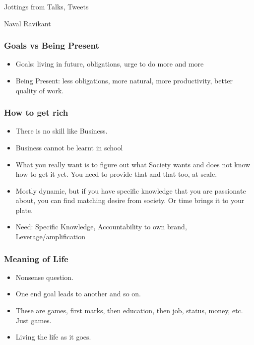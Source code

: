 \begin{frame}[fragile]\frametitle{}
\begin{center}
{\Large Jottings from Talks, Tweets}

{\small Naval Ravikant}


\end{center}
\end{frame}


\begin{frame}[fragile]\frametitle{Goals vs Being Present}

\begin{itemize}
\item Goals: living in future, obligations, urge to do more and more
\item Being Present: less obligations, more natural, more productivity, better quality of work.
\end{itemize}

\end{frame}


\begin{frame}[fragile]\frametitle{How to get rich}

\begin{itemize}
\item There is no skill like Business.
\item Business cannot be learnt in school
\item What you really want is to figure out what Society wants and does not know how to get it yet. You need to provide that and that too, at scale.
\item Mostly dynamic, but if you have specific knowledge that you are passionate about, you can find matching desire from society. Or time brings it to your plate.
\item Need: Specific Knowledge, Accountability to own brand, Leverage/amplification
\end{itemize}

\end{frame}

\begin{frame}[fragile]\frametitle{Meaning of Life}

\begin{itemize}
\item Nonsense question.
\item One end goal leads to another and so on.
\item These are games, first marks, then education, then job, status, money, etc. Just games.
\item Living the life as it goes.
\end{itemize}

\end{frame}


